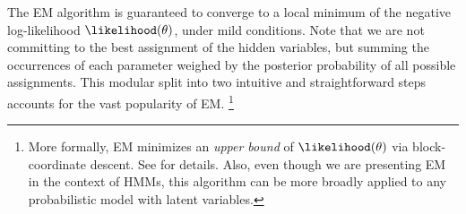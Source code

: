 The EM algorithm is guaranteed to
converge to a local minimum of the negative log-likelihood $\likelihood(\theta)$, under mild
conditions.  
Note that we are not committing to the best assignment of the hidden variables, but
summing the occurrences of each parameter weighed by the posterior
probability of all possible assignments. 
This modular split into two intuitive and straightforward steps
accounts for the vast popularity of EM.%
\footnote{More formally, EM minimizes an \emph{upper bound} of $\likelihood(\theta)$ via block-coordinate descent. See \citet{Neal1998} for details. Also, even though we are presenting EM in the context of HMMs, this algorithm can be more broadly applied to any probabilistic model with latent variables.} %

